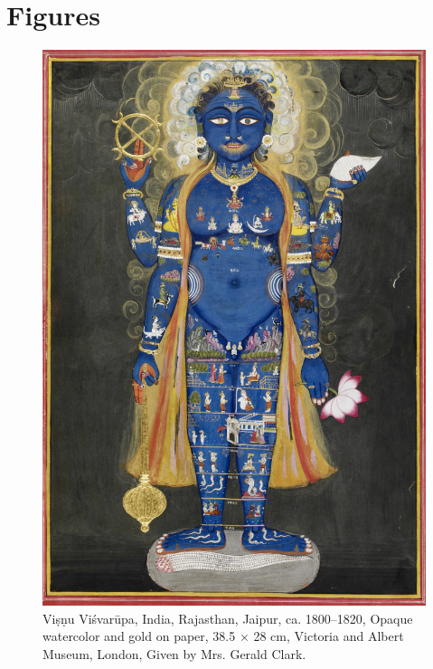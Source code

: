 \section{Figures}

\clearpage
  \begin{figure}[ht]
	\centering
  \includegraphics[width=1\textwidth]{pics/Vishnu_Vishvarupa_cropped.jpg}
	\caption{Viṣṇu Viśvarūpa, India, Rajasthan, Jaipur, ca. 1800–1820, Opaque watercolor and gold on paper, 38.5 × 28 cm, Victoria and Albert Museum, London, Given by Mrs. Gerald Clark.}
	\label{fig1}
      \end{figure}
\clearpage

